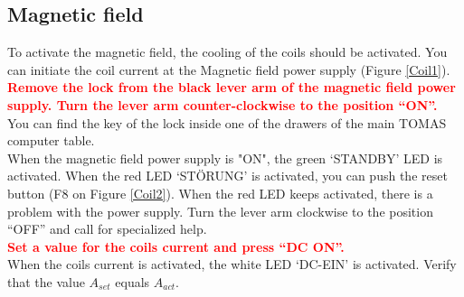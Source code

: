\documentclass[fleqn,a4paper,20pt]{article}
\begin{document}
\begin{minipage}{.68\textwidth}
\subsection{Magnetic field}
	
To activate the magnetic field, the cooling of the coils should be activated. You can initiate the coil current at the Magnetic field power supply (Figure \ref{Coil1}).\\

\textcolor{red}{\textbf{Remove the lock from the black lever arm of the magnetic field power supply. Turn the lever arm counter-clockwise to the position “ON”.}}\\

You can find the key of the lock inside one of the drawers of the main TOMAS computer table.\\

When the magnetic field power supply is "ON", the green `STANDBY' LED is activated. When the red LED `STÖRUNG' is activated, you can push the reset button (F8 on Figure \ref{Coil2}). When the red LED keeps activated, there is a problem with the power supply. Turn the lever arm clockwise to the position “OFF” and call for specialized help.\\


\textcolor{red}{\textbf{Set a value for the coils current and press “DC ON”. }}\\
	
When the coils current is activated, the white LED `DC-EIN' is activated. Verify that the value $A_{set}$ equals  $A_{act}$.\\
	
\end{minipage}
\begin{minipage}{.02\textwidth}
	$\ $\\
\end{minipage}
\end{document}
